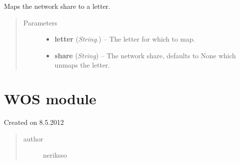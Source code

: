 \documentclass[letterpaper,10pt,english]{sphinxmanual}
\begin{document}
\begin{fulllineitems}
\label{utils:utils.MapNetworkShare}
Maps the network share to a letter.
\begin{quote}\begin{description}
\item[{Parameters}] \leavevmode\begin{itemize}
\item {} 
\textbf{letter} (\emph{String.}) -- The letter for which to map.

\item {} 
\textbf{share} (\emph{String}) -- The network share, defaults to None which unmaps the letter.

\end{itemize}

\end{description}\end{quote}

\end{fulllineitems}



\section{WOS module}
\label{wos:wos-module}\label{wos:module-wos}\label{wos::doc}
Created on 8.5.2012
\begin{quote}\begin{description}
\item[{author}] \leavevmode
neriksso

\end{description}\end{quote}
\end{document}
